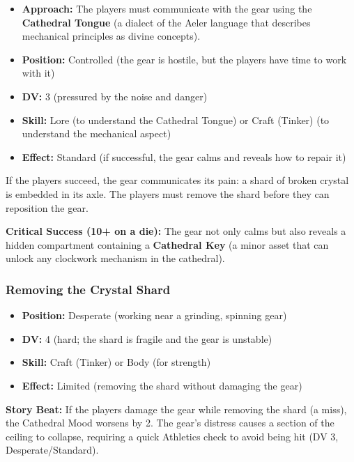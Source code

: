 \documentclass{article}
\begin{document}
\begin{itemize}
    \item \textbf{Approach:} The players must communicate with the gear using the \textbf{Cathedral Tongue} (a dialect of the Aeler language that describes mechanical principles as divine concepts).
    \item \textbf{Position:} Controlled (the gear is hostile, but the players have time to work with it)
    \item \textbf{DV:} 3 (pressured by the noise and danger)
    \item \textbf{Skill:} Lore (to understand the Cathedral Tongue) or Craft (Tinker) (to understand the mechanical aspect)
    \item \textbf{Effect:} Standard (if successful, the gear calms and reveals how to repair it)
\end{itemize}

If the players succeed, the gear communicates its pain: a shard of broken crystal is embedded in its axle. The players must remove the shard before they can reposition the gear.

\textbf{Critical Success (10+ on a die):} The gear not only calms but also reveals a hidden compartment containing a \textbf{Cathedral Key} (a minor asset that can unlock any clockwork mechanism in the cathedral).

\subsubsection{Removing the Crystal Shard}

\begin{itemize}
    \item \textbf{Position:} Desperate (working near a grinding, spinning gear)
    \item \textbf{DV:} 4 (hard; the shard is fragile and the gear is unstable)
    \item \textbf{Skill:} Craft (Tinker) or Body (for strength)
    \item \textbf{Effect:} Limited (removing the shard without damaging the gear)
\end{itemize}

\begin{storybox}
\textbf{Story Beat:} If the players damage the gear while removing the shard (a miss), the Cathedral Mood worsens by 2. The gear's distress causes a section of the ceiling to collapse, requiring a quick Athletics check to avoid being hit (DV 3, Desperate/Standard).
\end{storybox}
\end{document}
